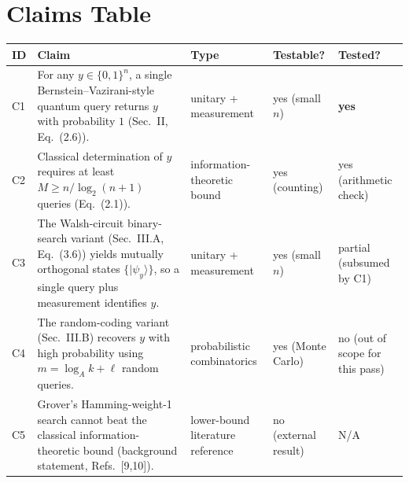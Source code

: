 \documentclass[11pt]{article}
\begin{document}
\section{Claims Table}
\begin{center}
\begin{tabular}{lp{7.5cm}lll}
\toprule
ID & Claim & Type & Testable? & Tested? \\
\midrule
C1 & For any $y\in\{0,1\}^n$, a single Bernstein--Vazirani-style quantum
     query returns $y$ with probability $1$ (Sec.~II, Eq.~(2.6)). &
     unitary + measurement & yes (small $n$) & \textbf{yes} \\
C2 & Classical determination of $y$ requires at least
     $M\ge n/\log_2(n+1)$ queries (Eq.~(2.1)). &
     information-theoretic bound & yes (counting) & yes (arithmetic check) \\
C3 & The Walsh-circuit binary-search variant (Sec.~III.A, Eq.~(3.6)) yields
     mutually orthogonal states $\{|\psi_y\rangle\}$, so a single query plus
     measurement identifies $y$. & unitary + measurement & yes (small $n$) & partial (subsumed by C1) \\
C4 & The random-coding variant (Sec.~III.B) recovers $y$ with high probability
     using $m = \log_A k + \ell$ random queries. & probabilistic combinatorics &
     yes (Monte Carlo) & no (out of scope for this pass) \\
C5 & Grover's Hamming-weight-1 search cannot beat the classical
     information-theoretic bound (background statement, Refs.~[9,10]). &
     lower-bound literature reference & no (external result) & N/A \\
\bottomrule
\end{tabular}
\end{center}
\end{document}
